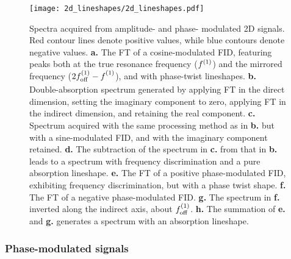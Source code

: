 \begin{figure}
    \centering
    \texttt{[image: 2d\_lineshapes/2d\_lineshapes.pdf]}
    \caption[
        Spectra acquired from amplitude- and phase-modulated \acs{2D} signals
        which have been processed in different ways.
    ]{
        Spectra acquired from amplitude- and phase- modulated \acs{2D} signals.
        Red contour lines denote positive values, while blue contours denote
        negative values.
        \textbf{a.} The \ac{FT} of a cosine-modulated \ac{FID}, featuring peaks
        both at the true resonance frequency ($f^{(1)}$) and the mirrored
        frequency ($2f_{\mathrm{off}}^{(1)} - f^{(1)}_{\vphantom{off}}$), and with phase-twist lineshapes.
        \textbf{b.} Double-absorption spectrum generated by applying \ac{FT}
        in the direct dimension, setting the imaginary component to zero,
        applying \ac{FT} in the indirect dimension, and retaining the real
        component.
        \textbf{c.} Spectrum acquired with the same processing method as in
        \textbf{b.} but with a sine-modulated \ac{FID}, and with the imaginary
        component retained.
        \textbf{d.} The subtraction of the spectrum in \textbf{c.} from that in
        \textbf{b.} leads to a spectrum with frequency discrimination and a
        pure absorption lineshape.
        \textbf{e.} The \ac{FT} of a positive phase-modulated \ac{FID},
        exhibiting frequency discrimination, but with a phase twist shape.
        \textbf{f.} The \ac{FT} of a negative phase-modulated \ac{FID}.
        \textbf{g.} The spectrum in \textbf{f.} inverted along the indirect
        axis, about $f_{\mathrm{off}}^{(1)}$.
        \textbf{h.} The summation of \textbf{e.} and \textbf{g.} generates a
        spectrum with an absorption lineshape.
    }
    \label{fig:2d-lineshapes}
\end{figure}

\subsubsection{Phase-modulated signals}

